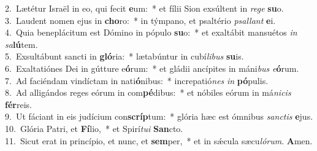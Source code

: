 {2.~}Lætétur Israël in eo, qui fecit \textbf{e}um:~* et fílii Sion exsúltent in \textit{re}\textit{ge} \textbf{su}o.\\
{3.~}Laudent nomen ejus in \textbf{cho}ro:~* in týmpano, et psaltério \textit{psal}\textit{lant} \textbf{e}i.\\
{4.~}Quia beneplácitum est Dómino in pópulo \textbf{su}o:~* et exaltábit mansuétos \textit{in} \textit{sa}\textbf{lú}tem.\\
{5.~}Exsultábunt sancti in \textbf{gló}ria:~* lætabúntur in cubí\textit{li}\textit{bus} \textbf{su}is.\\
{6.~}Exaltatiónes Dei in gútture e\textbf{ó}rum:~* et gládii ancípites in máni\textit{bus} \textit{e}\textbf{ó}rum.\\
{7.~}Ad faciéndam vindíctam in nati\textbf{ó}nibus:~* increpatió\textit{nes} \textit{in} \textbf{pó}pulis.\\
{8.~}Ad alligándos reges eórum in com\textbf{pé}dibus:~* et nóbiles eórum in má\textit{ni}\textit{cis} \textbf{fér}reis.\\
{9.~}Ut fáciant in eis judícium con\textbf{scríp}tum:~* glória hæc est ómnibus \textit{san}\textit{ctis} \textbf{e}jus.\\
{10.~}Glória Patri, et \textbf{Fí}lio,~* et Spirí\textit{tu}\textit{i} \textbf{San}cto.\\
{11.~}Sicut erat in princípio, et nunc, et \textbf{sem}per,~* et in sǽcula sæcu\textit{ló}\textit{rum}. \textbf{A}men.\\
